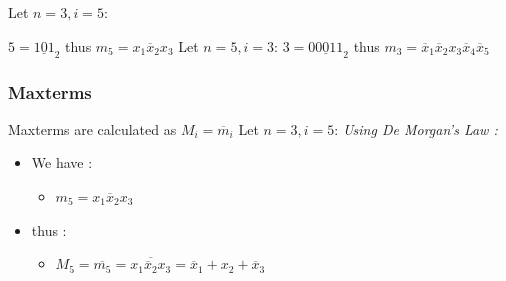 \documentclass[12pt,openany, tikz,border=10pt]{book}
\begin{document}
Let $ n = 3, i = 5$:\newline

$ 5 = \underline{101}_2$
thus $m_5 = x_1 \overline{x}_2 x_3$ \newline
Let $n=5, i=3$:\newline
$ 3 = \underline{00011}_2$
thus $m_3 = \overline{x}_1 \overline{x}_2 x_3 \overline{x}_4 \overline{x}_5$ \newline

\newpage
\subsubsection{Maxterms}
Maxterms are calculated as $M_i = \overline{m}_i$ \newline
Let $ n = 3, i = 5$:
\newline \textit{Using De Morgan's Law :}
\begin{itemize}
    \item[]We have :
    \begin{itemize}
        \item[] $m_5 = x_1 \overline{x}_2 x_3$
    \end{itemize}
    \item[]thus :
    \begin{itemize}
        \item[] $M_5 = \overline{m_5} =  \overline{x_1 \overline{x}_2 x_3} = \overline{x}_1 + x_2 + \overline{x}_3$ \newline
    \end{itemize}
\end{itemize}
\end{document}
